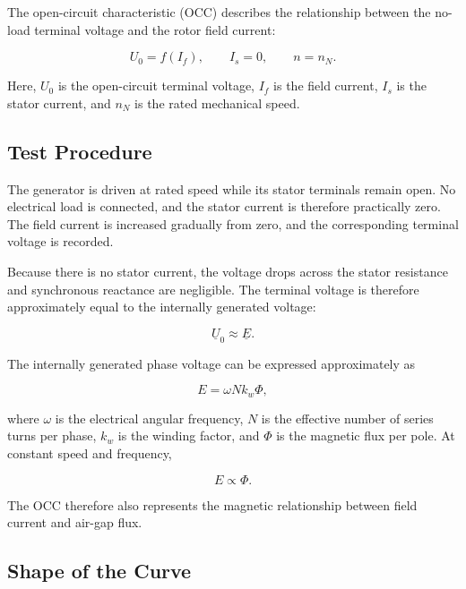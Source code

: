 The open-circuit characteristic (OCC) describes the relationship between the
no-load terminal voltage and the rotor field current:

\begin{equation}
  U_0=f(I_f),
  \qquad I_s=0,
  \qquad n=n_N.
  \label{eq:sg-occ-definition}
\end{equation}

Here, $U_0$ is the open-circuit terminal voltage, $I_f$ is the field current,
$I_s$ is the stator current, and $n_N$ is the rated mechanical speed.

\subsection{Test Procedure}

The generator is driven at rated speed while its stator terminals remain open.
No electrical load is connected, and the stator current is therefore
practically zero. The field current is increased gradually from zero, and the
corresponding terminal voltage is recorded.

Because there is no stator current, the voltage drops across the stator
resistance and synchronous reactance are negligible. The terminal voltage is
therefore approximately equal to the internally generated voltage:

\begin{equation}
  \underline{U}_0\approx\underline{E}.
  \label{eq:sg-occ-internal-voltage}
\end{equation}

The internally generated phase voltage can be expressed approximately as

\begin{equation}
  E=\omega N k_w\Phi,
  \label{eq:sg-induced-voltage}
\end{equation}

where $\omega$ is the electrical angular frequency, $N$ is the effective
number of series turns per phase, $k_w$ is the winding factor, and $\Phi$ is
the magnetic flux per pole. At constant speed and frequency,

\begin{equation}
  E\propto\Phi.
\end{equation}

The OCC therefore also represents the magnetic relationship between field
current and air-gap flux.

\subsection{Shape of the Curve}

